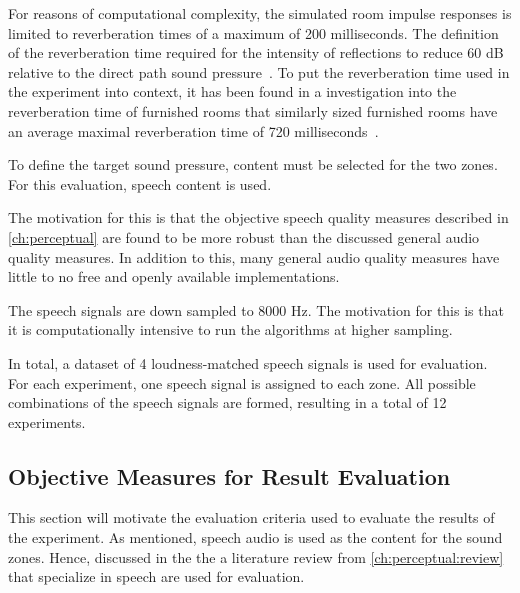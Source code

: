 For reasons of computational complexity, the simulated room impulse responses is limited to reverberation times of a maximum of 200
milliseconds.
The definition of the reverberation time required for the intensity of reflections to reduce 60 dB relative 
to the direct path sound pressure~\cite{habets2006room}. 
To put the reverberation time used in the experiment into context, it has been found in a investigation into the reverberation time of furnished rooms
that similarly sized furnished rooms have an average maximal reverberation time of 720 milliseconds~\cite{diaz2005reverberation}.

To define the target sound pressure, content must be selected for the two zones.
For this evaluation, speech content is used.

The motivation for this is that the objective speech quality measures described in \autoref{ch:perceptual} are found to be more robust than
the discussed general audio quality measures.
In addition to this, many general audio quality measures have little to no free and openly available implementations.

The speech signals are down sampled to 8000 Hz.
The motivation for this is that it is computationally intensive to run the algorithms at higher sampling.

In total, a dataset of 4 loudness-matched speech signals is used for evaluation.
For each experiment, one speech signal is assigned to each zone.
All possible combinations of the speech signals are formed, resulting in a total of 12 experiments.

\subsection{Objective Measures for Result Evaluation}
This section will motivate the evaluation criteria used to evaluate the results of the experiment.
As mentioned, speech audio is used as the content for the sound zones.
Hence, discussed in the the a literature review from \autoref{ch:perceptual:review} that specialize in speech are used for evaluation.

